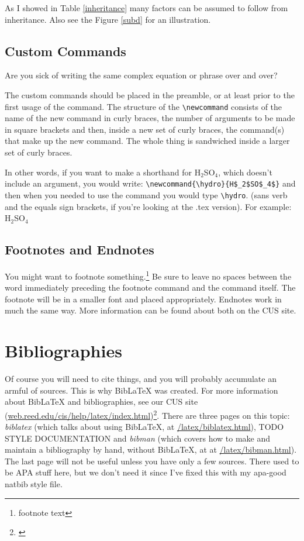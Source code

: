 \documentclass[
    12pt,
    twoside,
    bibstyle=ieee,
    headerstyle=uppercase
]{reedthesis}
\begin{document}
 As I showed in Table \ref{inheritance} many factors can be assumed to follow from inheritance. Also see the Figure \ref{subd} for an illustration.
 
\subsection{Custom Commands}\label{commands}
Are you sick of writing the same complex equation or phrase over and over? 

The custom commands should be placed in the preamble, or at least prior to the first usage of the command. The structure of the \verb=\newcommand= consists of the name of the new command in curly braces, the number of arguments to be made in square brackets and then, inside a new set of curly braces, the command(s) that make up the new command. The whole thing is sandwiched inside a larger set of curly braces. 

\newcommand{\hydro}{H$_2$SO$_4$}

In other words, if you want to make a shorthand for H$_2$SO$_4$, which doesn't include an argument, you would write: \verb=\newcommand{\hydro}{H$_2$SO$_4$}= and then when you needed  to use the command you would type \verb=\hydro=. (sans verb and the equals sign brackets, if you're looking at the .tex version). For example: \hydro

\subsection{Footnotes and Endnotes}
	You might want to footnote something.\footnote{footnote text} Be sure to leave no spaces between the word immediately preceding the footnote command and the command itself. The footnote will be in a smaller font and placed appropriately. Endnotes work in much the same way. More information can be found about both on the CUS site.
	
\section{Bibliographies}
	Of course you will need to cite things, and you will probably accumulate an armful of sources. This is why BibLaTeX was created. For more information about BibLaTeX and bibliographies, see our CUS site (\url{web.reed.edu/cis/help/latex/index.html})\footnote{\cite{reedweb:2007}}. There are three pages on this topic: {\it biblatex} (which talks about using BibLaTeX, at \url{/latex/biblatex.html}), TODO STYLE DOCUMENTATION and {\it bibman} (which covers how to make and maintain a bibliography by hand, without BibLaTeX, at at \url{/latex/bibman.html}). The last page will not be useful unless you have only a few sources. There used to be APA stuff here, but we don't need it since I've fixed this with my apa-good natbib style file.
	
\end{document}
